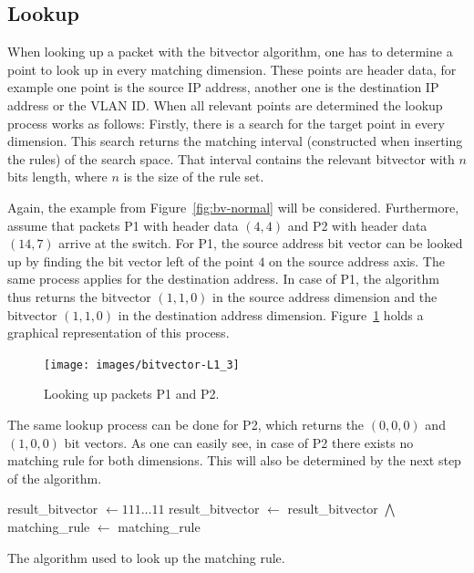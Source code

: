 \documentclass[a4paper,
		12pt,
		parskip=full,
		titlepage
		]{scrartcl}
\begin{document}
\subsection{Lookup}
When looking up a packet with the bitvector algorithm, one has to determine a point to look up in every matching dimension.
These points are header data, for example one point is the source IP address, another one is the destination IP address or the VLAN ID.
When all relevant points are determined the lookup process works as follows:
Firstly, there is a search for the target point in every dimension.
This search returns the matching interval (constructed when inserting the rules) of the search space.
That interval contains the relevant bitvector with $n$ bits length, where $n$ is the size of the rule set.

Again, the example from Figure~\ref{fig:bv-normal} will be considered.
Furthermore, assume that packets P1 with header data $(4, 4)$ and P2 with header data $(14, 7)$ arrive at the switch.
For P1, the source address bit vector can be looked up by finding the bit vector left of the point $4$ on the source address axis.
The same process applies for the destination address.
In case of P1, the algorithm thus returns the bitvector $(1, 1, 0)$ in the 
source address dimension and the bitvector $(1, 1, 0)$ in the destination address dimension.
Figure~\ref{fig:bv-lookup} holds a graphical representation of this process.

\begin{figure}
\centering
\texttt{[image: images/bitvector-L1\_3]}
\caption{Looking up packets P1 and P2.}
\label{fig:bv-lookup}
\end{figure}

The same lookup process can be done for P2, which returns the $(0, 0, 0)$ and $(1, 0, 0)$ bit vectors.
As one can easily see, in case of P2 there exists no matching rule for both dimensions.
This will also be determined by the next step of the algorithm.

\begin{algorithm}
\begin{algorithmic}
    \State result\_bitvector $\gets 111\ldots 11$
        \State result\_bitvector $\gets$ result\_bitvector $\bigwedge$ 
    \EndFor
    \State matching\_rule $\gets$ 
    \State \Return matching\_rule
\EndFunction
\end{algorithmic}
\caption{The algorithm used to look up the matching rule.}
\label{alg:bv-join}
\end{algorithm}
\end{document}
